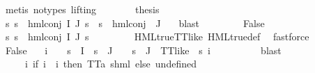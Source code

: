 \begin{isabellebody}
\ {\isacharparenleft}{\kern0pt}metis\ {\isacharparenleft}{\kern0pt}no{\isacharunderscore}{\kern0pt}types{\isacharcomma}{\kern0pt}\ lifting{\isacharparenright}{\kern0pt}{\isacharparenright}{\kern0pt}\isanewline
\ \ \ \ \isamarkupfalse%
\ \isamarkupfalse%
\ {\isacharquery}{\kern0pt}thesis\ \isanewline
\ \ \ \ \ \ \isamarkupfalse%
\ {\isacartoucheopen}{\isasymforall}s{\isachardot}{\kern0pt}\ {\isacharparenleft}{\kern0pt}s\ {\isasymTurnstile}\ hml{\isacharunderscore}{\kern0pt}conj\ I\ J\ {\isasympsi}s{\isacharparenright}{\kern0pt}\ {\isacharequal}{\kern0pt}\ {\isacharparenleft}{\kern0pt}s\ {\isasymTurnstile}\ hml{\isacharunderscore}{\kern0pt}conj\ {\isacharbraceleft}{\kern0pt}{\isacharbraceright}{\kern0pt}\ J\ {\isasymPsi}{\isacharparenright}{\kern0pt}{\isacartoucheclose}\ \isamarkupfalse%
\ blast\isanewline
\ \ \isamarkupfalse%
\isanewline
\ \ \ \ \isamarkupfalse%
\ False\isanewline
\ \ \ \ \isamarkupfalse%
\ {\isachardoublequoteopen}{\isasymforall}s{\isachardot}{\kern0pt}\ {\isasymnot}{\isacharparenleft}{\kern0pt}s\ {\isasymTurnstile}\ hml{\isacharunderscore}{\kern0pt}conj\ I\ J\ {\isasympsi}s{\isacharparenright}{\kern0pt}{\isachardoublequoteclose}\ \isanewline
\ \ \ \ \ \ \isamarkupfalse%
\ HML{\isacharunderscore}{\kern0pt}true{\isacharunderscore}{\kern0pt}TT{\isacharunderscore}{\kern0pt}like\ HML{\isacharunderscore}{\kern0pt}true{\isacharunderscore}{\kern0pt}def\ \isamarkupfalse%
\ fastforce\isanewline
\ \ \ \ \isamarkupfalse%
\ False\ \isamarkupfalse%
\ {\isasymphi}\ i{\isacharunderscore}{\kern0pt}{\isasymphi}\ \ {\isachardoublequoteopen}{\isasymphi}\ {\isasymin}\ {\isasympsi}s\ {\isacharbackquote}{\kern0pt}\ I\ {\isasyminter}\ {\isasympsi}s\ {\isacharbackquote}{\kern0pt}\ J\ {\isasymor}\ {\isacharparenleft}{\kern0pt}{\isasymphi}\ {\isasymin}\ {\isasympsi}s\ {\isacharbackquote}{\kern0pt}\ J\ {\isasymand}\ TT{\isacharunderscore}{\kern0pt}like\ {\isasymphi}{\isacharparenright}{\kern0pt}{\isachardoublequoteclose}\ {\isachardoublequoteopen}{\isasympsi}s\ i{\isacharunderscore}{\kern0pt}{\isasymphi}\ {\isacharequal}{\kern0pt}\ {\isasymphi}{\isachardoublequoteclose}\isanewline
\ \ \ \ \ \ \isamarkupfalse%
\ blast\isanewline
\ \ \ \ \isamarkupfalse%
\ {\isasymPsi}\ \ {\isachardoublequoteopen}{\isasymPsi}\ {\isasymequiv}\ {\isacharparenleft}{\kern0pt}{\isasymlambda}i{\isachardot}{\kern0pt}\ {\isacharparenleft}{\kern0pt}if\ i\ {\isacharequal}{\kern0pt}\ i{\isacharunderscore}{\kern0pt}{\isasymphi}\ then\ TT{\isacharcolon}{\kern0pt}{\isacharcolon}{\kern0pt}{\isacharparenleft}{\kern0pt}{\isacharprime}{\kern0pt}a{\isacharcomma}{\kern0pt}\ {\isacharprime}{\kern0pt}s{\isacharparenright}{\kern0pt}hml\ else\ undefined{\isacharparenright}{\kern0pt}{\isacharparenright}{\kern0pt}{\isachardoublequoteclose}\isanewline

\end{isabellebody}
